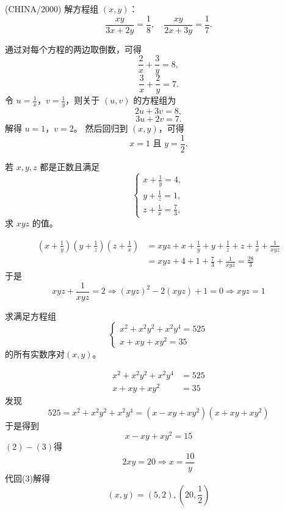 \begin{questions}
    \question (CHINA/2000) 解方程组 $(x, y)$：
\[
\frac{xy}{3x + 2y} = \frac{1}{8}, \quad \frac{xy}{2x + 3y} = \frac{1}{7}.
\]

\begin{solution}
通过对每个方程的两边取倒数，可得
\[
\frac{2}{x} + \frac{3}{y} = 8,
\]
\[
\frac{3}{x} + \frac{2}{y} = 7.
\]
令 $u = \frac{1}{x}$，$v = \frac{1}{y}$，则关于 $(u, v)$ 的方程组为
\[
2u + 3v = 8,
\]
\[
3u + 2v = 7.
\]
解得 $u = 1$，$v = 2$。
然后回归到 $(x, y)$，可得
\[
x = 1 \text{ 且 } y = \frac{1}{2}.
\]
\end{solution}
    \question 若 $x, y, z$ 都是正数且满足 
    \[
    \begin{cases}
    \displaystyle x+\frac{1}{y}=4,\\[8pt] 
    \displaystyle y+\frac{1}{z}=1,\\[8pt] 
    \displaystyle z+\frac{1}{x}=\frac{7}{3}, 
    \end{cases}
    \]
    求 $xyz$ 的值。
    \begin{solution} 
        \begin{align*} 
        \left(x+\frac{1}{y}\right)\left(y+\frac{1}{z}\right)\left(z+\frac{1}{x}\right)
        &= xyz + x+\frac{1}{y} + y+\frac{1}{z} + z+\frac{1}{x} + \frac{1}{xyz}\\
        &= xyz + 4 + 1 + \frac{7}{3} + \frac{1}{xyz} = \frac{28}{3}
        \end{align*}
        于是
        \[
        xyz + \frac{1}{xyz} = 2 
        \Rightarrow (xyz)^2 - 2(xyz) + 1 = 0 
        \Rightarrow xyz = 1
        \]
    \end{solution}

    \question 求满足方程组
    \[
    \begin{cases}
    x^2 + x^2y^2 + x^2y^4 = 525 \\
    x + xy + xy^2 = 35
    \end{cases}
    \]
    的所有实数序对$(x,y)$。
    \begin{solution}
        \begin{align}
        x^2 + x^2y^2 + x^2y^4 &= 525 \\
        x + xy + xy^2 &= 35
        \end{align}
        发现
        \[
        525=x^2 + x^2y^2 + x^2y^4=(x - xy + xy^2)(x +xy+xy^2)
        \]
        于是得到
        \[
        x - xy + xy^2  = 15 \tag{3}
        \]
        $(2)-(3)$得
        \[
        2xy = 20 \Rightarrow x = \frac{10}{y}
        \]
        代回(3)解得
        \[
        (x,y)=(5,2),\left(20,\frac{1}{2}\right)
        \]
    \end{solution}


\end{questions}

